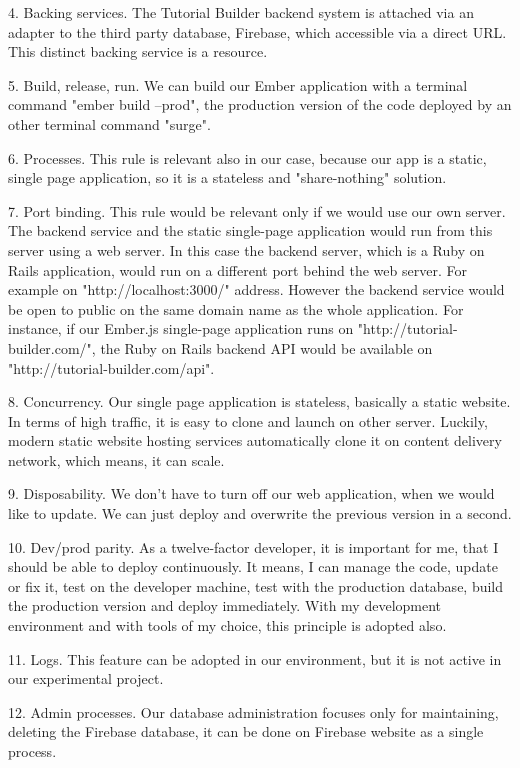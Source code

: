 \documentclass[12pt, a4paper, oneside, openright, medskipamount]{report}
\begin{document}
4. Backing services. The Tutorial Builder backend system is attached via an adapter to the third party database, Firebase, which accessible via a direct URL. This distinct backing service is a resource.

5. Build, release, run. We can build our Ember application with a terminal command "ember build --prod", the production version of the code deployed by an other terminal command "surge".

6. Processes. This rule is relevant also in our case, because our app is a static, single page application, so it is a stateless and "share-nothing" solution.

7. Port binding. This rule would be relevant only if we would use our own server. The backend service and the static single-page application would run from this server using a web server. In this case the backend server, which is a Ruby on Rails application, would run on a different port behind the web server. For example on "http://localhost:3000/" address. However the backend service would be open to public on the same domain name as the whole application. For instance, if our Ember.js single-page application runs on "http://tutorial-builder.com/", the Ruby on Rails backend API would be available on "http://tutorial-builder.com/api".

8. Concurrency. Our single page application is stateless, basically a static website. In terms of high traffic, it is easy to clone and launch on other server. Luckily, modern static website hosting services automatically clone it on content delivery network, which means, it can scale.

9. Disposability. We don't have to turn off our web application, when we would like to update. We can just deploy and overwrite the previous version in a second.

10. Dev/prod parity. As a twelve-factor developer, it is important for me, that I should be able to deploy continuously. It means, I can manage the code, update or fix it, test on the developer machine, test with the production database, build the production version and deploy immediately. With my development environment and with tools of my choice, this principle is adopted also.

11. Logs. This feature can be adopted in our environment, but it is not active in our experimental project.

12. Admin processes. Our database administration focuses only for maintaining, deleting the Firebase database, it can be done on Firebase website as a single process.
\end{document}
